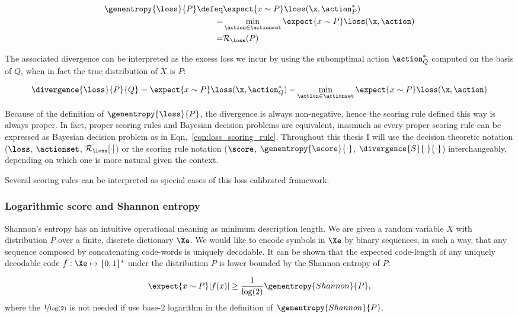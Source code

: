 \begin{align}
	\genentropy{\loss}{P} \defeq &\expect{x\sim P} \loss(\x,\action^{*}_{P})\\
		= &\min_{\action\in\actionset} \expect{x\sim P} \loss(\x,\action)\\
		= &\mathcal{R}_{\loss}(P)
\end{align}

The associated divergence can be interpreted as the excess loss we incur by using the subomptimal action $\action^{*}_{Q}$ computed on the basis of $Q$, when in fact the true distribution of $X$ is $P$:

\begin{align}
	\divergence{\loss}{P}{Q} = \expect{x\sim P} \loss(\x,\action^{*}_{Q}) - \min_{\action \in \actionset}\expect{x\sim P} \loss(\x,\action)
\end{align}

Because of the definition of $\genentropy{\loss}{P}$, the divergence is always non-negative, hence the scoring rule defined this way is always proper. In fact, proper scoring rules and Bayesian decision problems are equivalent, inasmuch as every proper scoring rule can be expressed as Bayesian decision problem as in Eqn.\ \eqref{eqn:loss_scoring_rule}. Throughout this thesis I will use the decision theoretic notation ($\loss$, $\actionset$, $\mathcal{R}_{\loss}[\cdot]$) or the scoring rule notation ($\score$, $\genentropy{\score}{\cdot}$, $\divergence{S}{\cdot}{\cdot}$) interchangeably, depending on which one is more natural given the context.

Several scoring rules can be interpreted as special cases of this loss-calibrated framework.

\subsubsection{Logarithmic score and Shannon entropy}

Shannon's entropy has an intuitive operational meaning as minimum description length. We are given a random variable $X$ with distribution $P$ over a finite, discrete dictionary $\Xe$. We would like to encode symbols in $\Xe$ by binary sequences, in such a way, that any sequence composed by concatenating code-words is uniquely decodable. It can be shown that the expected code-length of any uniquely decodable code $f:\Xe\mapsto\{0,1\}^{*}$ under the distribution $P$ is lower bounded by the Shannon entropy of $P$:

\begin{equation}
	\expect{x \sim P} \vert f(x) \vert \geq \frac{1}{\log(2)}\genentropy{Shannon}{P},
\end{equation}
where the $\nicefrac{1}{\log(2)}$ is not needed if use base-2 logarithm in the definition of $\genentropy{Shannon}{P}$.
 
